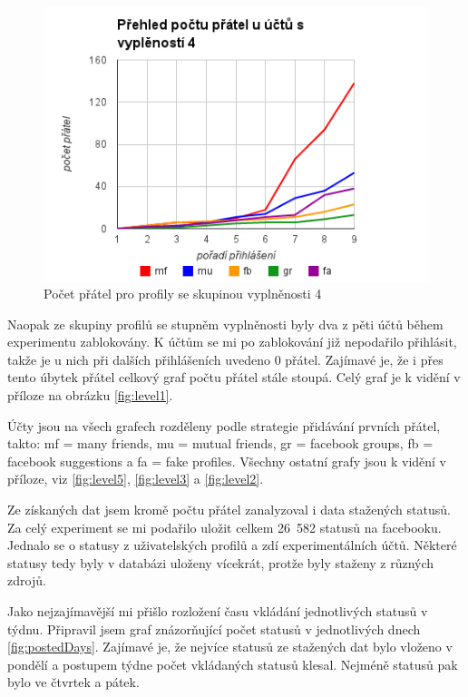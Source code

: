 \documentclass[thesis=M,czech]{FITthesis}[2013/05/10]
\begin{document}
\begin{figure}[h]
\begin{center}
\includegraphics[width=5in]{figures/level4.png}
\caption{Počet přátel pro profily se skupinou vyplněnosti 4}
\label{fig:level4}
\end{center}
\end{figure}

Naopak ze skupiny profilů se stupněm vyplněnosti byly dva z pěti účtů během experimentu zablokovány. K účtům se mi po zablokování již nepodařilo přihlásit, takže je u nich při dalších přihlášeních uvedeno 0 přátel. Zajímavé je, že i přes tento úbytek přátel celkový graf počtu přátel stále stoupá. Celý graf je k vidění v příloze na obrázku \ref{fig:level1}.

Účty jsou na všech grafech rozděleny podle strategie přidávání prvních přátel, takto: mf = many friends, mu = mutual friends, gr = facebook groups, fb = facebook suggestions a fa = fake profiles. Všechny ostatní grafy jsou k vidění v příloze, viz \ref{fig:level5}, \ref{fig:level3} a \ref{fig:level2}.


Ze získaných dat jsem kromě počtu přátel zanalyzoval i data stažených statusů. Za celý experiment se mi podařilo uložit celkem 26~582 statusů na facebooku. Jednalo se o statusy z uživatelských profilů a zdí experimentálních účtů. Některé statusy tedy byly v databázi uloženy vícekrát, protže byly staženy z různých zdrojů.

Jako nejzajímavější mi přišlo rozložení času vkládání jednotlivých statusů v týdnu. Připravil jsem graf znázorňující počet statusů v jednotlivých dnech \ref{fig:postedDays}. Zajímavé je, že nejvíce statusů ze stažených dat bylo vloženo v pondělí a postupem týdne počet vkládaných statusů klesal. Nejméně statusů pak bylo ve čtvrtek a pátek.
\end{document}
